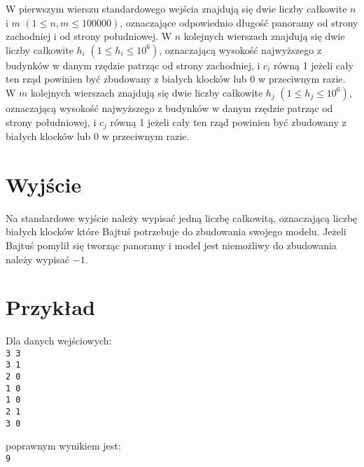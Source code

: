 \documentclass[10pt]{article}
\begin{document}
    W pierwszym wierszu standardowego wejścia znajdują się dwie liczby całkowite $n$ i $m$ $(1 \leq n, m \leq 100000)$, oznaczające odpowiednio długość panoramy od strony zachodniej i od strony południowej. W $n$ kolejnych wierszach znajdują się dwie liczby całkowite $h_{i}$ $(1\leq h_{i}\leq 10^{6})$, oznaczającą wysokość najwyższego z budynków w danym rzędzie patrząc od strony zachodniej, i $c_{i}$ równą 1 jeżeli cały ten rząd powinien być zbudowany z białych klocków lub 0 w przeciwnym razie. W $m$ kolejnych wierszach znajdują się dwie liczby całkowite $h_{j}$ $(1\leq h_{j}\leq 10^{6})$, oznaczającą wysokość najwyższego z budynków w danym rzędzie patrząc od strony południowej, i $c_{j}$ równą 1 jeżeli cały ten rząd powinien być zbudowany z białych klocków lub 0 w przeciwnym razie.


    \section*{Wyjście}
    
    Na standardowe wyjście należy wypisać jedną liczbę całkowitą, oznaczającą liczbę białych klocków które Bajtuś potrzebuje do zbudowania swojego modelu. Jeżeli Bajtuś pomylił się tworząc panoramy i model jest niemożliwy do zbudowania należy wypisać $-1$.


    \section*{Przykład}
    
    \noindent
    \begin{minipage}[t]{0.5\textwidth}
        Dla danych wejściowych:\vspace{1ex}\\
        \texttt{3 3\\3 1\\2 0\\1 0\\1 0\\2 1\\3 0}
    \end{minipage}
    \begin{minipage}[t]{0.5\textwidth}
        poprawnym wynikiem jest:\vspace{1ex}\\
        \texttt{9}
    \end{minipage}
    
\end{document}
